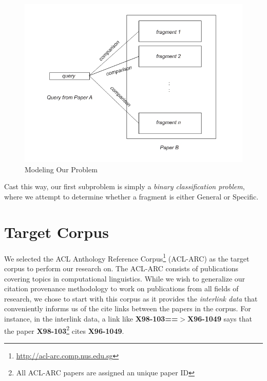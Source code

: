 \begin{figure}[h]
  \centering
  \includegraphics[scale=0.50]{./model}
  \caption{Modeling Our Problem}
  \label{fig:model}
\end{figure}

Cast this way, our first subproblem is simply a \textit{binary classification problem}, where we attempt to determine whether a fragment is either General or Specific.

\section{Target Corpus}
\label{buildingcorpus}
We selected the ACL Anthology Reference Corpus\footnote{\url{http://acl-arc.comp.nus.edu.sg}} (ACL-ARC) as the target corpus to perform our research on. The ACL-ARC consists of publications covering topics in computational linguistics.  While we wish to generalize our citation provenance methodology to work on publications from all fields of research, we chose to start with this corpus as it provides the \textit{interlink data} that conveniently informs us of the cite links between the papers in the corpus. For instance, in the interlink data, a link like \textbf{X98-103==$>$X96-1049} says that the paper \textbf{X98-103}\footnote{All ACL-ARC papers are assigned an unique paper ID} cites \textbf{X96-1049}.  


